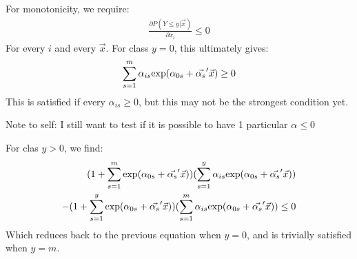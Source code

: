 \documentclass[12pt]{article}
\begin{document}
For monotonicity, we require:
\begin{align*}
	\frac{\partial P(Y \leq y | \vec{x})}{\partial x_i} \leq 0
\end{align*}
For every $i$ and every $\vec{x}$. For class $y = 0$, this ultimately gives:
\begin{align*}
	\sum_{s = 1}^{m} \alpha_{is} \textup{exp} (\alpha_{0s} + \vec{\alpha_{s}}' \vec{x}) \geq 0
\end{align*}
This is satisfied if every $\alpha_{is} \geq 0$, but this may not be the strongest condition yet.

Note to self: I still want to test if it is possible to have 1 particular $\alpha \leq 0$

For clas $y > 0$, we find:
\begin{align*}
	(1 + \sum_{s = 1}^{m} \textup{exp} (\alpha_{0s} + \vec{\alpha_{s}}' \vec{x}))(\sum_{s = 1}^{y} \alpha_{is} \textup{exp} (\alpha_{0s} + \vec{\alpha_{s}}' \vec{x})) \\
	- (1 + \sum_{s = 1}^{y} \textup{exp} (\alpha_{0s} + \vec{\alpha_{s}}' \vec{x}))(\sum_{s = 1}^{m} \alpha_{is} \textup{exp} (\alpha_{0s} + \vec{\alpha_{s}}' \vec{x})) \leq 0
\end{align*}
Which reduces back to the previous equation when $y = 0$, and is trivially satisfied when $y = m$. 
\end{document}
